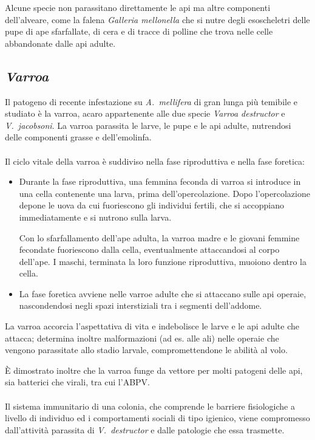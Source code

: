 Alcune specie non parassitano direttamente le api ma altre componenti dell'alveare, come la falena \emph{Galleria mellonella} che si nutre degli esoscheletri delle pupe di ape sfarfallate, di cera e di tracce di polline che trova nelle celle abbandonate dalle api adulte.

\subsection{\emph{Varroa}}
Il patogeno di recente infestazione su \emph{A.~mellifera} di gran lunga più temibile e studiato
è la varroa, acaro appartenente alle due specie \emph{Varroa destructor} e \emph{V.~jacobsoni}. La varroa parassita le larve, le pupe e le api adulte, nutrendosi delle componenti grasse e dell'emolinfa.

\paragraph{}
Il ciclo vitale della varroa è suddiviso nella fase riproduttiva e nella fase foretica:
\begin{itemize}
    \item Durante la fase riproduttiva, una femmina feconda di varroa si introduce in una cella contenente una larva, prima dell'opercolazione. Dopo l'opercolazione depone le uova da cui fuoriescono gli individui fertili, che si accoppiano immediatamente e si nutrono sulla larva.

    Con lo sfarfallamento dell'ape adulta, la varroa madre e le giovani femmine fecondate fuoriescono dalla cella, eventualmente attaccandosi al corpo dell'ape.
    I maschi, terminata la loro funzione riproduttiva, muoiono dentro la cella.
    \item La fase foretica avviene nelle varroe adulte che si attaccano sulle api operaie, nascondendosi negli spazi interstiziali tra i segmenti dell'addome.
\end{itemize}

La varroa accorcia l'aspettativa di vita e indebolisce le larve e le api adulte che attacca; determina inoltre malformazioni (ad es. alle ali) nelle operaie che vengono parassitate allo stadio larvale, compromettendone le abilità al volo.

È dimostrato inoltre che la varroa funge da vettore per molti patogeni delle api, sia batterici che virali, tra cui l'ABPV.

\paragraph{}
Il sistema immunitario di una colonia, che comprende le barriere fisiologiche a livello di individuo ed i comportamenti sociali di tipo igienico, viene compromesso dall'attività parassita di \emph{V.~destructor} e dalle patologie che essa trasmette.

